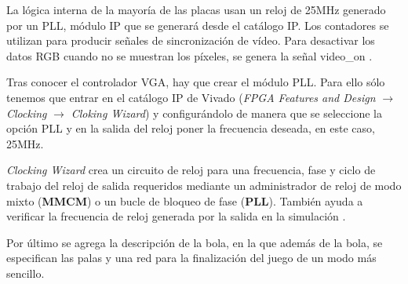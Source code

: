 La lógica interna de la mayoría de las placas usan un reloj de 25MHz generado por un PLL, módulo IP que se generará desde 
el catálogo IP. Los contadores se utilizan para producir señales de sincronización de vídeo. Para desactivar los 
datos RGB cuando no se muestran los píxeles, se genera la señal video\_on \cite{hamblen2007rapid}. 

Tras conocer el controlador VGA, hay que crear el módulo PLL. Para ello sólo tenemos que entrar en el catálogo IP de Vivado 
(\textit{FPGA Features and Design} $\rightarrow$ \textit{Clocking} $\rightarrow$ \textit{Cloking Wizard}) y configurándolo 
de manera que se seleccione la opción PLL y en la salida del reloj poner la frecuencia deseada, en este caso, 25MHz.

\textit{Clocking Wizard} crea un circuito de reloj para una frecuencia, fase y ciclo de trabajo del reloj de salida 
requeridos mediante un administrador de reloj de modo mixto (\textbf{MMCM}) o un bucle de bloqueo de fase (\textbf{PLL}). 
También ayuda a verificar la frecuencia de reloj generada por la salida en la simulación \cite{pll}.

Por último se agrega la descripción de la bola, en la que además de la bola, se especifican las palas y una red para la 
finalización del juego de un modo más sencillo.

